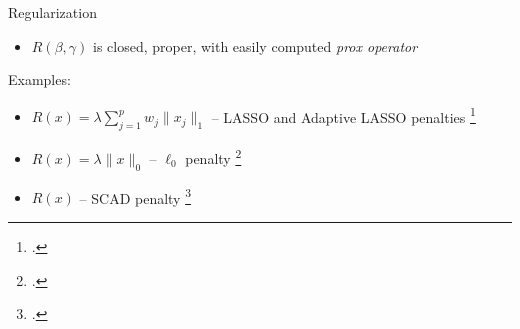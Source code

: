 \documentclass[8pt]{beamer}
\begin{document}
\begin{frame}{Regularization}
\begin{itemize}
	\item $R(\beta, \gamma)$ is closed, proper, with easily computed \textit{prox operator}
\end{itemize}


Examples: 
\begin{itemize}
	\item $R(x) = \lambda\sum_{j=1}^p w_j\|x_j\|_1$ -- LASSO and Adaptive LASSO penalties \footcite{Krishna2008,Lin2013}
	\item $R(x) = \lambda \|x\|_0$ -- $\ell_0$ penalty \footcite{Jones2011}
	\item $R(x)$ -- SCAD penalty \footcite{Fan2012}
\end{itemize}


\end{frame}
\end{document}
